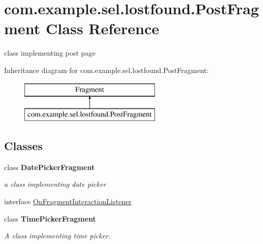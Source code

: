 \hypertarget{classcom_1_1example_1_1sel_1_1lostfound_1_1PostFragment}{}\section{com.\+example.\+sel.\+lostfound.\+Post\+Fragment Class Reference}
\label{classcom_1_1example_1_1sel_1_1lostfound_1_1PostFragment}


class implementing post page  


Inheritance diagram for com.\+example.\+sel.\+lostfound.\+Post\+Fragment\+:\begin{figure}[H]
\begin{center}
\leavevmode
\includegraphics[height=2.000000cm]{classcom_1_1example_1_1sel_1_1lostfound_1_1PostFragment}
\end{center}
\end{figure}
\subsection*{Classes}
\begin{DoxyCompactItemize}
\item 
class {\bfseries Date\+Picker\+Fragment}
\begin{DoxyCompactList}\small\item\em a class implementing date picker \end{DoxyCompactList}\item 
interface \hyperlink{interfacecom_1_1example_1_1sel_1_1lostfound_1_1PostFragment_1_1OnFragmentInteractionListener}{On\+Fragment\+Interaction\+Listener}
\item 
class {\bfseries Time\+Picker\+Fragment}
\begin{DoxyCompactList}\small\item\em A class implementing time picker. \end{DoxyCompactList}\end{DoxyCompactItemize}
